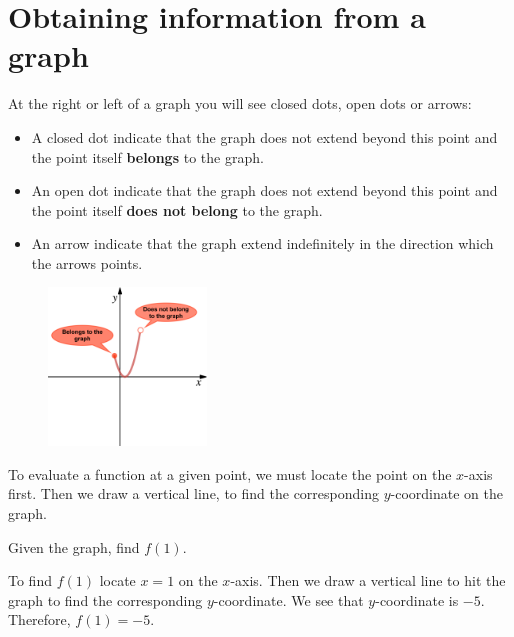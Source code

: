 \section{Obtaining information from a graph}
At the right or left of a graph you will see closed dots, open dots or arrows:
\begin{itemize}
    \setlength\itemsep{0em}
    \item A closed dot indicate that the graph does not extend beyond this point and the point itself \textbf{belongs} to the graph.
    \item An open dot indicate that the graph does not extend beyond this point and the point itself \textbf{does not belong} to the graph.
    \item An arrow indicate that the graph extend indefinitely in the direction which the arrows points.
\end{itemize}
\begin{figure}[ht]
    \centering
    \includegraphics[width=4.2cm]{Pics/endpoints.png}
    \label{fig:endpoints}
\end{figure}


To evaluate a function at a given point, we must locate the point on the $x$-axis first. Then we draw a vertical line, to find the corresponding $y$-coordinate on the graph.
\begin{exa}
    Given the graph, find $f(1)$.
\end{exa}
\begin{center}
\end{center}
To find $f(1)$ locate $x=1$ on the $x$-axis. Then we draw a vertical line to hit the graph to find the corresponding $y$-coordinate. We see that $y$-coordinate is $-5$. Therefore, $f(1)=-5$.
\begin{center}
\end{center}
